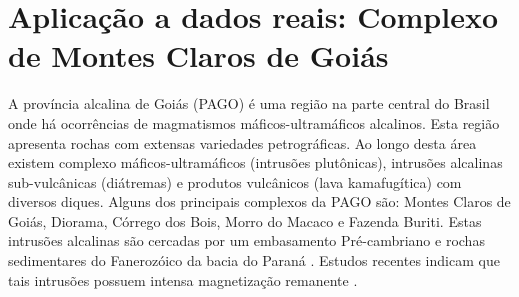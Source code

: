 \chapter{Aplicação a dados reais: Complexo de Montes Claros de Goiás}
\label{sec:real_application}

A província alcalina de Goiás (PAGO) é uma região na parte central do Brasil onde há ocorrências de magmatismos máficos-ultramáficos alcalinos. Esta região apresenta rochas com extensas variedades petrográficas. Ao longo desta área existem complexo máficos-ultramáficos (intrusões plutônicas), intrusões alcalinas sub-vulcânicas (diátremas) e produtos vulcânicos (lava kamafugítica) com diversos diques. Alguns dos principais complexos da PAGO são: Montes Claros de Goiás, Diorama, Córrego dos Bois, Morro do Macaco e Fazenda Buriti. Estas intrusões alcalinas são cercadas por um embasamento Pré-cambriano e rochas sedimentares do Fanerozóico da bacia do Paraná \citep{junqueira_brod_2005,carlson_etal_2007,marangoni_mantovani_2013,dutra_etal_2014}. Estudos recentes indicam que tais intrusões 
possuem intensa magnetização remanente \citep{marangoni_mantovani_2013,oliveirajr_etal_2015,marangoni_etal_2016,zhang_etal_2018}.

